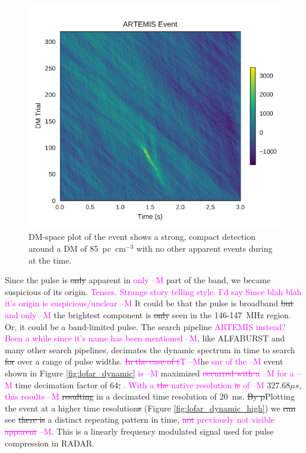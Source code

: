 \documentclass[a4paper,fleqn,usenatbib]{mnras}
\newcommand{\cM}[1]{\textcolor{magenta}{ #1 --M}}
\begin{document}
\begin{figure}
    \includegraphics[width=1.0\linewidth]{figures/LOFAR_dm_time.pdf}
    \caption{DM-space plot of the event shows a strong, compact detection around
    a DM of 85~pc~cm$^{-3}$ with no other apparent events during at the time.
    }
    \label{fig:lofar_dm_time}
\end{figure}

Since the pulse is \sout{only} apparent in \cM{only} part of the band, we became suspicious of its
origin. \cM{Tenses. Strange story telling style. I'd say Since blah blah it's origin is suspicious/unclear} 
It could be that the pulse is broadband \sout{but} \cM{and only} the brightest component is
\sout{only} seen in the 146-147~MHz region. Or, it could be a band-limited pulse.  The
search pipeline \cM{ARTEMIS instead? Been a while since it's name has been mentioned}, like ALFABURST and many other search pipelines, decimates the
dynamic spectrum in time to search \sout{for} over a range of pulse widths. \cM{\sout{In the case
of t}T}he \cM{\gls{snr} of the} event shown in Figure \ref{fig:lofar_dynamic} \cM{is} maximized 
\cM{\sout{occurred with a}} \cM{for a} time decimation factor of 64\sout{,}\cM{. With a \sout{the} native resolution \sout{is} of} $327.68
\mu s$, \cM{this results} \sout{resulting} in a decimated time resolution of 20~ms. \sout{By  p}Plotting the event
at a higher time resolution\sout{s} (Figure \ref{fig:lofar_dynamic_high}) we \sout{can} see
\sout{there is} a distinct repeating pattern in time, \cM{\sout{not} previously not visible \sout{apparent}}. This is a
linearly frequency modulated signal used for pulse compression in RADAR.
\end{document}
